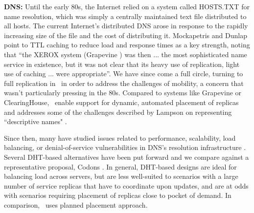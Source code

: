 \textbf{DNS:} Until the early 80s, the Internet relied on a system called HOSTS.TXT for name resolution, which was simply a centrally maintained text file distributed to all hosts. The current Internet's distributed DNS \cite{DNS} arose in response to the rapidly increasing size of the file and the cost of distributing it. Mockapetris and Dunlap point to TTL caching to reduce load and response times as a key strength, noting that ``the XEROX system (Grapevine \cite{grapevine}) was then ... the most sophisticated name service in existence, but it was not clear that its heavy use of replication, light use of caching ... were appropriate''. We have since come a full circle, turning to  full replication in \auspice\ in order to address the challenges of mobility, a concern that wasn't particularly pressing  in the 80s. Compared to systems like Grapevine or ClearingHouse, \auspice\ enable support for dynamic, automated placement of replicas and addresses some of the challenges described by Lampson on representing ``descriptive names" \cite{Lampson}.

Since then, many have studied issues related to performance, scalability, load balancing, or denial-of-service vulnerabilities in DNS's resolution infrastructure \cite{Pappas,codons-paper,Brownlee,dnssec}. Several DHT-based alternatives have been put forward \cite{codons-paper,cox,beehive,DHTdns} and we compare against a representative proposal, Codons \cite{codons-paper}. In general, DHT-based designs are ideal for balancing load across servers, but are less well-suited to scenarios with a large number of service replicas that have to coordinate upon updates, and are at odds with scenarios requiring placement of replicas close to pocket of demand. In comparison, \auspice\ uses planned placement approach.




